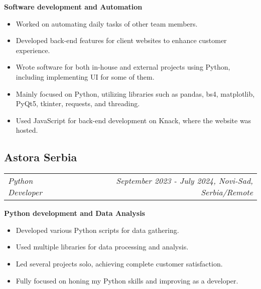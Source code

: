 \documentclass[11pt,a4paper]{moderncv}
\newcommand*{\experienceentry}[5][1.5mm]{
    \subsection{#2} \vspace{-1.5mm}
    \begin{tabularx}{\textwidth}{LR}
        {\itshape #3} & {\itshape #4, #5}
    \end{tabularx}
    \par\addvspace{#1}
}
\begin{document}
\begin{minipage}[t]{0.62\textwidth}
    \textbf{Software development and Automation}
    \begin{itemize}
        \item Worked on automating daily tasks of other team members.
        \item Developed back-end features for client websites to enhance customer experience.
        \item Wrote software for both in-house and external projects using Python, including implementing UI for some of them.
        \item Mainly focused on Python, utilizing libraries such as pandas, bs4, matplotlib, PyQt5, tkinter, requests, and threading.
        \item Used JavaScript for back-end development on Knack, where the website was hosted.
    \end{itemize}
    \vspace{1.0mm}

    \experienceentry{Astora Serbia}{Python Developer}{September 2023 - July 2024}{Novi-Sad, Serbia/Remote}

    \textbf{Python development and Data Analysis}
    \begin{itemize}
        \item Developed various Python scripts for data gathering.
        \item Used multiple libraries for data processing and analysis.
        \item Led several projects solo, achieving complete customer satisfaction.
        \item Fully focused on honing my Python skills and improving as a developer.
    \end{itemize}
    \vspace{2.0mm}

\end{minipage}
\hfill
\end{document}

